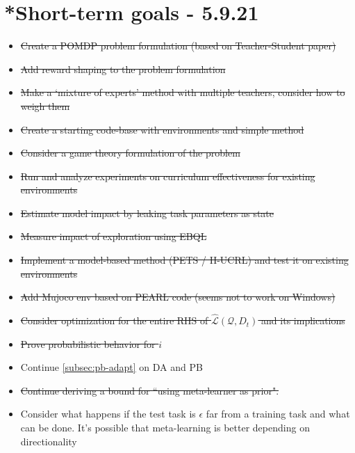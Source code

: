 \documentclass[letterpaper]{article}
\theoremstyle{definition}
\begin{document}
\section{*Short-term goals - 5.9.21} \label{sec:short-term}

\begin{itemize}
	\item \sout{Create a POMDP problem formulation (based on Teacher-Student paper) }
	\item \sout{Add reward shaping to the problem formulation}
	\item \sout{Make a `mixture of experts' method with multiple teachers, consider how to weigh them}
	\item \sout{Create a starting code-base with environments and simple method}
	\item \sout{Consider a game theory formulation of the problem}
	\item \sout{Run and analyze experiments on curriculum effectiveness for existing environments}
	\item \sout{Estimate model impact by leaking task parameters as state}
	\item \sout{Measure impact of exploration using EBQL}
	\item \sout{Implement a model-based method (PETS / H-UCRL) and test it on existing environments}
	\item \sout{Add Mujoco env based on PEARL code (seems not to work on Windows)}
	\item \sout{Consider optimization for the entire RHS of $\hat{\mathcal{L}}(\mathcal{Q}, D_t)$ and its implications}
	\item \sout{Prove probabilistic behavior for $i$}
	\item Continue \ref{subsec:pb-adapt} on DA and PB
	\item \sout{Continue deriving a bound for ``using meta-learner as prior".} 
	\item Consider what happens if the test task is $\epsilon$ far from a training task and what can be done. It's possible that meta-learning is better depending on directionality
\end{itemize}
\end{document}
